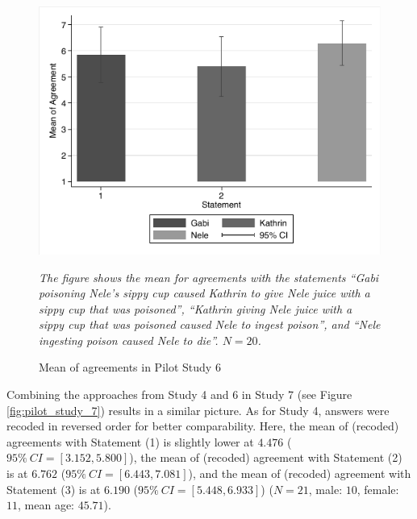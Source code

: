 \documentclass[egregdoesnotlikesansseriftitles,12pt]{scrartcl}
\begin{document}
\begin{figure}[H]
   \centering
   \includegraphics[scale=0.8]{figures/pilot_study_6.pdf}
   \begin{minipage}{0.9\linewidth}
   \footnotesize
   \emph{The figure shows the mean for agreements with the statements ``Gabi poisoning Nele's sippy cup caused Kathrin to give Nele juice with a sippy cup that was poisoned'', ``Kathrin giving Nele juice with a sippy cup that was poisoned caused Nele to ingest poison'', and ``Nele ingesting poison caused Nele to die''. $N=20$.}
   \end{minipage}
   \caption{Mean of agreements in Pilot Study 6}
   \label{fig:pilot_study_6}
\end{figure}

\noindent Combining the approaches from Study 4 and 6 in Study 7 (see Figure \ref{fig:pilot_study_7}) results in a similar picture. As for Study 4, answers were recoded in reversed order for better comparability. Here, the mean of (recoded) agreements with Statement (1) is slightly lower at $4.476$ ($95\%~CI=[3.152,5.800]$), the mean of (recoded) agreement with Statement (2) is at $6.762$ ($95\%~CI=[6.443,7.081]$), and the mean of (recoded) agreement with Statement (3) is at $6.190$ ($95\%~CI=[5.448,6.933]$) ($N=21$, male: $10$, female: $11$, mean age: $45.71$).
\end{document}
